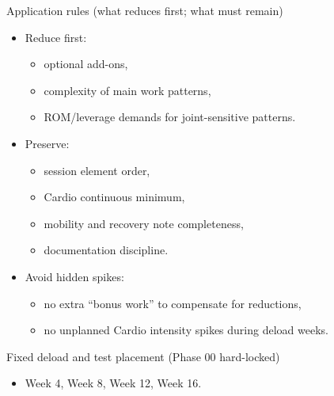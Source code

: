 \documentclass[10pt]{article}
\begin{document}
Application rules (what reduces first; what must remain)

\begin{itemize}
\item Reduce first:
  \begin{itemize}
  \item optional add-ons,
  \item complexity of main work patterns,
  \item ROM/leverage demands for joint-sensitive patterns.
  \end{itemize}
\item Preserve:
  \begin{itemize}
  \item session element order,
  \item Cardio continuous minimum,
  \item mobility and recovery note completeness,
  \item documentation discipline.
  \end{itemize}
\item Avoid hidden spikes:
  \begin{itemize}
  \item no extra “bonus work” to compensate for reductions,
  \item no unplanned Cardio intensity spikes during deload weeks.
  \end{itemize}
\end{itemize}

Fixed deload and test placement (Phase 00 hard-locked)

\begin{itemize}
\item Week 4, Week 8, Week 12, Week 16.
\end{itemize}
\end{document}
